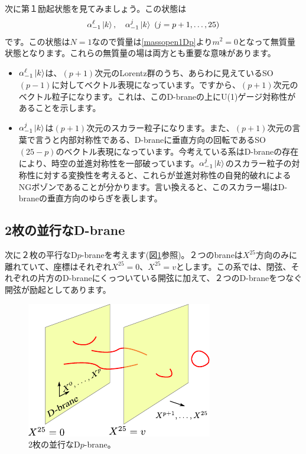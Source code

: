 \documentclass[report,paper=a4, fontsize=12pt, line_length=16cm, number_of_lines=33,dvipdfmx]{jlreq}
\numberwithin{equation}{chapter}
\numberwithin{equation}{section}
\begin{document}
次に第１励起状態を見てみましょう。この状態は
\begin{align}
  \alpha_{-1}^{\ell}\ket{k},\quad 
  \alpha_{-1}^{j}\ket{k}\ (j=p+1,\dots,25)
\end{align}
です。この状態は$N=1$なので質量は\eqref{massopen1Dp}より$m^2=0$となって無質量状態となります。これらの無質量の場は両方とも重要な意味があります。
\begin{itemize}
  \item $\alpha_{-1}^{\ell}\ket{k}$は、$(p+1)$次元のLorentz群のうち、あらわに見えているSO$(p-1)$に対してベクトル表現になっています。ですから、$(p+1)$次元のベクトル粒子になります。これは、このD-braneの上にU(1)ゲージ対称性があることを示します。
  \item $\alpha_{-1}^{j}\ket{k}$は$(p+1)$次元のスカラー粒子になります。また、$(p+1)$次元の言葉で言うと内部対称性である、D-braneに垂直方向の回転であるSO$(25-p)$のベクトル表現になっています。今考えている系はD-braneの存在により、時空の並進対称性を一部破っています。$\alpha_{-1}^{j}\ket{k}$のスカラー粒子の対称性に対する変換性を考えると、これらが並進対称性の自発的破れによるNGボゾンであることが分かります。言い換えると、このスカラー場はD-braneの垂直方向のゆらぎを表します。
\end{itemize}

\subsection{2枚の並行なD-brane}
次に２枚の平行なD$p$-braneを考えます(図\ref{fig:parallelbrane}参照)。２つのbraneは$X^{25}$方向のみに離れていて、座標はそれぞれ$X^{25}=0$、$X^{25}=v$とします。この系では、閉弦、それぞれの片方のD-braneにくっついている開弦に加えて、２つのD-braneをつなぐ開弦が励起としてあります。
\begin{figure}
  \centering
  \includegraphics[scale=1.5]{parallelbrane.pdf}
  \caption{2枚の並行なD$p$-brane。}
  \label{fig:parallelbrane}
\end{figure}
\end{document}
